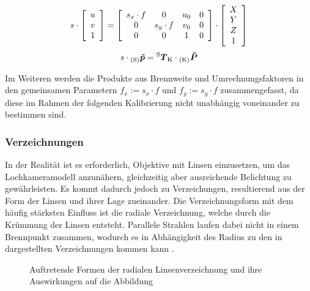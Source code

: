 

\begin{equation}
s \cdot 
\mat{c}{
u\\
v\\
1
}
= 
\mat{cccc}{
s_x \cdot f & 0 & u_\ind{0} & 0\\
0 & s_y \cdot f & v_\ind{0} & 0\\
0 & 0 & 1 & 0
}
 \cdot
\mat{c}{
X\\
Y\\
Z\\
1
}
\label{eq.intrinsic}
\end{equation}
\begin{equation}
s \cdot {_{{\mathrm{(S)}}}}\mbox{\boldmath{$\tilde{p}$}} = {^{\mathrm{S}}\mbox{\boldmath{$T$}}_{\mathrm{K}}} \cdot {_{{\mathrm{(K)}}}}\mbox{\boldmath{$\tilde{P}$}}
\end{equation}

Im Weiteren werden die Produkte aus Brennweite und Umrechnungsfaktoren in den gemeinsamen Parametern $f_x := s_x \cdot f$ und $f_y := s_y \cdot f$ zusammengefasst, da diese im Rahmen der folgenden Kalibrierung nicht unabhängig voneinander zu bestimmen sind.

\subsubsection{Verzeichnungen}
In der Realität ist es erforderlich, Objektive mit Linsen einzusetzen, um das Lochkameramodell anzunähern, gleichzeitig aber ausreichende Belichtung zu gewährleisten. Es kommt dadurch jedoch zu Verzeichungen, resultierend aus der Form der Linsen und ihrer Lage zueinander. Die Verzeichnungsform mit dem häufig stärksten Einfluss ist die radiale Verzeichnung, welche durch die Krümmung der Linsen entsteht. Parallele Strahlen laufen dabei nicht in einem Brennpunkt zusammen, wodurch es in Abhängigkeit des Radius zu den in  dargestellten Verzeichnungen kommen kann \cite{Hertzberg2012}.

\begin{figure}[!ht]
	\begin{center}
	\hspace{4mm}
	\hspace{4mm}
	\caption{Auftretende Formen der radialen Linsenverzeichnung und ihre Auswirkungen auf die Abbildung}
	\label{fig.distortions}
	\end{center}
\end{figure}

